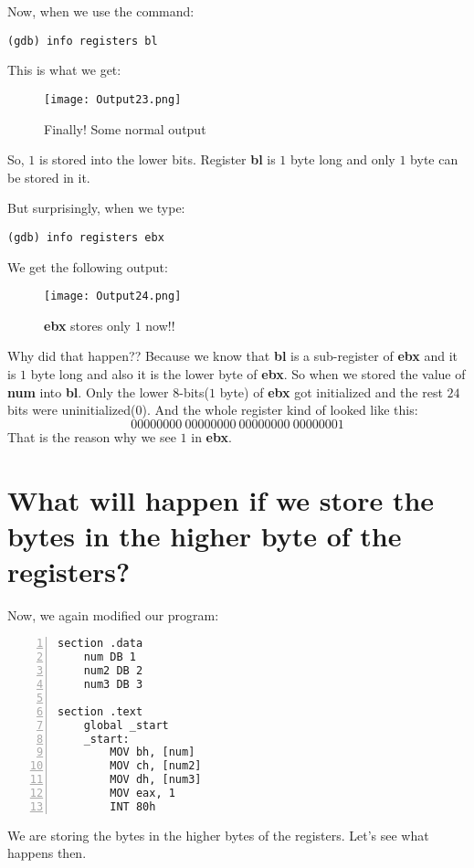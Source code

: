 \documentclass{article}
\makeatletter
\renewcommand\paragraph{\@startsection{paragraph}{4}{\z@}{-3.25ex \@plus -1ex \@minus -.2ex}{1.5ex \@plus .2ex}{\normalfont\normalsize\bfseries}}
\makeatother
\begin{document}
\vspace{10pt}
Now, when we use the command:

\begin{Verbatim}[frame=single]
(gdb) info registers bl
\end{Verbatim}

This is what we get:
\begin{figure}[h]
\centering
\texttt{[image: Output23.png]}
\caption{Finally! Some normal output}
\label{fig:norm1}
\end{figure}

So, $1$ is stored into the lower bits. Register \textbf{bl} is $1$ byte long and only $1$ byte can be stored in it.

But surprisingly, when we type:
\begin{Verbatim}[frame=single]
(gdb) info registers ebx
\end{Verbatim}

We get the following output:

\begin{figure}[h]
\centering
\texttt{[image: Output24.png]}
\caption{\textbf{ebx} stores only $1$ now!!}
\label{fig:norm2}
\end{figure}

Why did that happen?? Because we know that \textbf{bl} is a sub-register of \textbf{ebx} and it is $1$ byte long and also it is the lower byte of \textbf{ebx}. So when we stored the value of \textbf{num} into \textbf{bl}. Only the lower $8$-bits($1$ byte) of \textbf{ebx} got initialized and the rest $24$ bits were uninitialized($0$). And the whole register kind of looked like this:
$$
00000000\ 00000000\ 00000000\ 00000001
$$
That is the reason why we see $1$ in \textbf{ebx}.

\newpage
\section{What will happen if we store the bytes in the higher byte of the registers?}\label{sec:highByte}
\paragraph{}
Now, we again modified our program:
\begin{Verbatim}[numbers=left, frame=single]
section .data
	num DB 1
	num2 DB 2
	num3 DB 3
	
section .text
	global _start
	_start:
		MOV bh, [num]
		MOV ch, [num2]
		MOV dh, [num3]
		MOV eax, 1
		INT 80h
\end{Verbatim}
We are storing the bytes in the higher bytes of the registers. Let's see what happens then.
\end{document}
